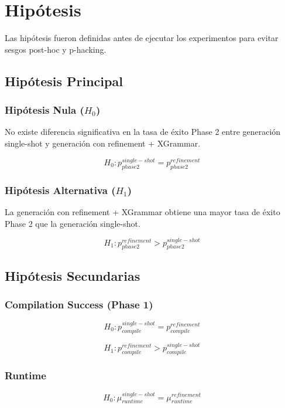 \documentclass[12pt]{article}
\begin{document}
\section{Hipótesis}

Las hipótesis fueron definidas antes de ejecutar los experimentos para evitar sesgos post-hoc y p-hacking.

\subsection{Hipótesis Principal}

\subsubsection*{Hipótesis Nula ($H_0$)}

No existe diferencia significativa en la tasa de éxito Phase 2 entre generación single-shot y generación con refinement + XGrammar.

\[
H_0 : p_{phase2}^{single-shot} = p_{phase2}^{refinement}
\]

\subsubsection*{Hipótesis Alternativa ($H_1$)}

La generación con refinement + XGrammar obtiene una mayor tasa de éxito Phase 2 que la generación single-shot.

\[
H_1 : p_{phase2}^{refinement} > p_{phase2}^{single-shot}
\]

\subsection{Hipótesis Secundarias}

\subsubsection*{Compilation Success (Phase 1)}

\[
H_0 : p_{compile}^{single-shot} = p_{compile}^{refinement}
\]

\[
H_1 : p_{compile}^{refinement} > p_{compile}^{single-shot}
\]

\subsubsection*{Runtime}

\[
H_0 : \mu_{runtime}^{single-shot} = \mu_{runtime}^{refinement}
\]
\end{document}
